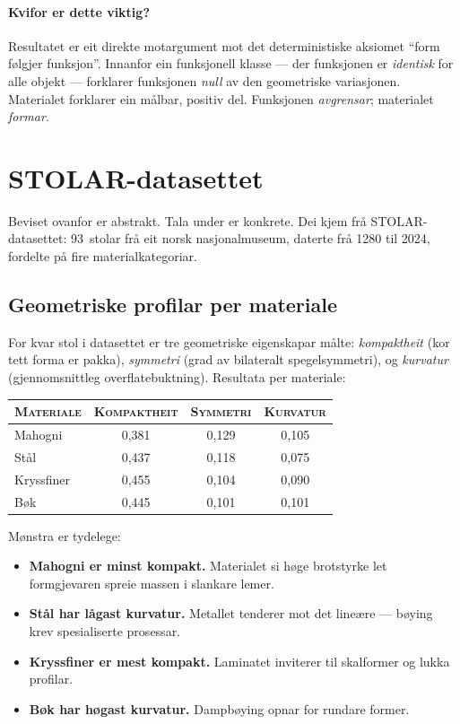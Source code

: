 \paragraph{Kvifor er dette viktig?}
Resultatet er eit direkte motargument mot det deterministiske
aksiomet ``form følgjer funksjon''. Innanfor ein funksjonell
klasse --- der funksjonen er \emph{identisk} for alle objekt ---
forklarer funksjonen \emph{null} av den geometriske variasjonen.
Materialet forklarer ein målbar, positiv del. Funksjonen
\emph{avgrensar}; materialet \emph{formar}.


\section{STOLAR-datasettet}

Beviset ovanfor er abstrakt. Tala under er konkrete. Dei kjem frå
STOLAR-datasettet: 93~stolar frå eit norsk nasjonalmuseum,
daterte frå 1280 til 2024, fordelte på fire materialkategoriar.

\subsection{Geometriske profilar per materiale}

For kvar stol i datasettet er tre geometriske eigenskapar målte:
\emph{kompaktheit} (kor tett forma er pakka), \emph{symmetri}
(grad av bilateralt spegelsymmetri), og \emph{kurvatur}
(gjennomsnittleg overflatebuktning). Resultata per materiale:

\medskip
\begin{center}
\begin{tabular}{@{}lccc@{}}
\toprule
\textsc{Materiale} & \textsc{Kompaktheit}
  & \textsc{Symmetri} & \textsc{Kurvatur} \\
\midrule
Mahogni    & 0{,}381 & 0{,}129 & 0{,}105 \\
Stål       & 0{,}437 & 0{,}118 & 0{,}075 \\
Kryssfiner & 0{,}455 & 0{,}104 & 0{,}090 \\
Bøk        & 0{,}445 & 0{,}101 & 0{,}101 \\
\bottomrule
\end{tabular}
\end{center}

\medskip
Mønstra er tydelege:
\begin{itemize}[nosep]
  \item \textbf{Mahogni er minst kompakt.} Materialet si høge
    brotstyrke let formgjevaren spreie massen i slankare lemer.
  \item \textbf{Stål har lågast kurvatur.} Metallet tenderer mot
    det lineære --- bøying krev spesialiserte prosessar.
  \item \textbf{Kryssfiner er mest kompakt.} Laminatet inviterer
    til skalformer og lukka profilar.
  \item \textbf{Bøk har høgast kurvatur.} Dampbøying opnar for
    rundare former.
\end{itemize}

